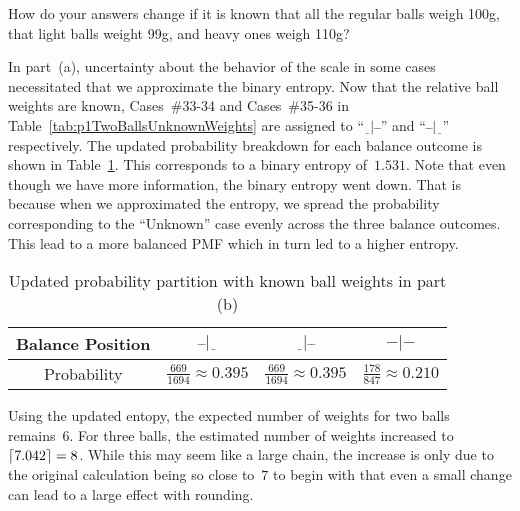 \begin{subproblem}
  How do your answers change if it is known that all the regular balls weigh 100g, that light balls weight 99g, and heavy ones weigh 110g?
\end{subproblem}

  In part~(a), uncertainty about the behavior of the scale in some cases necessitated that we approximate the binary entropy.  Now that the relative ball weights are known, Cases~\#33-34 and Cases~\#35-36 in Table~\ref{tab:p1TwoBallsUnknownWeights} are assigned to ``${\underline{~~}|\bar{~}\bar{~}}$'' and ``${\bar{~}\bar{~}|\underline{~~}}$'' respectively.  The updated probability breakdown for each balance outcome is shown in Table~\ref{tab:twoBallProbabilityBreakdownKnownWeights}.  This corresponds to a binary entropy of~$1.531$.  Note that even though we have more information, the binary entropy went down.  That is because when we approximated the entropy, we spread the probability corresponding to the ``Unknown'' case evenly across the three balance outcomes.  This lead to a more balanced PMF which in turn led to a higher entropy.
  
  \begin{table}
    \centering
    \caption{Updated probability partition with known ball weights in part (b)}\label{tab:twoBallProbabilityBreakdownKnownWeights}
    \begin{tabular}{|c||c|c|c|}
      \hline
      Balance Position & $\bar{~}\bar{~}|\underline{~~}$  & $\underline{~~}|\bar{~}\bar{~}$  & $-|-$ \\\hline
      Probability      & $\frac{669}{1694} \approx 0.395$ & $\frac{669}{1694} \approx 0.395$ & $\frac{178}{847} \approx 0.210$   \\\hline
    \end{tabular}
  \end{table}
  
  Using the updated entopy, the expected number of weights for two balls remains~6.  For three balls, the estimated number of weights increased to~${\ceil*{7.042} = 8}$.  While this may seem like a large chain, the increase is only due to the original calculation being so close to~$7$ to begin with that even a small change can lead to a large effect with rounding.
  
  